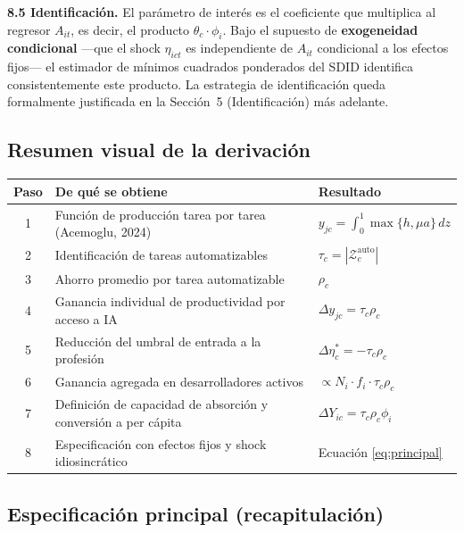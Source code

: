 \documentclass[11pt,a4paper]{article}
\theoremstyle{definition}
\begin{document}
\textbf{8.5 Identificación.} El parámetro de interés es el coeficiente que multiplica al regresor $A_{it}$, es decir, el producto $\theta_c\cdot\phi_i$. Bajo el supuesto de \textbf{exogeneidad condicional} ---que el shock $\eta_{ict}$ es independiente de $A_{it}$ condicional a los efectos fijos--- el estimador de mínimos cuadrados ponderados del SDID identifica consistentemente este producto. La estrategia de identificación queda formalmente justificada en la Sección~5 (Identificación) más adelante.

\subsection{Resumen visual de la derivación}

\begin{center}
\small
\renewcommand{\arraystretch}{1.30}
\begin{tabular}{cp{8cm}l}
\toprule
\textbf{Paso} & \textbf{De qué se obtiene}                                   & \textbf{Resultado} \\
\midrule
1 & Función de producción tarea por tarea (Acemoglu, 2024)         & $y_{jc} = \int_0^1 \max\{h, \mu a\}\,dz$ \\
2 & Identificación de tareas automatizables                         & $\tau_c = |\mathcal{Z}_c^{\text{auto}}|$ \\
3 & Ahorro promedio por tarea automatizable                          & $\rho_c$ \\
4 & Ganancia individual de productividad por acceso a IA             & $\Delta y_{jc} = \tau_c \rho_c$ \\
5 & Reducción del umbral de entrada a la profesión                   & $\Delta \eta_c^* = -\tau_c \rho_c$ \\
6 & Ganancia agregada en desarrolladores activos                     & $\propto N_i \cdot f_i \cdot \tau_c \rho_c$ \\
7 & Definición de capacidad de absorción y conversión a per cápita   & $\Delta Y_{ic} = \tau_c\rho_c\phi_i$ \\
8 & Especificación con efectos fijos y shock idiosincrático          & Ecuación \eqref{eq:principal} \\
\bottomrule
\end{tabular}
\end{center}

\subsection{Especificación principal (recapitulación)}
\end{document}
